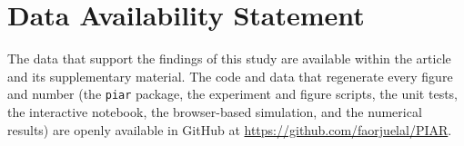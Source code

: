 \documentclass[%
 aip,
 cha,
 amsmath,amssymb,
 reprint,%
 longbibliography,%
]{revtex4-1}
\begin{document}
\section*{Data Availability Statement}
The data that support the findings of this study are available within the article and its supplementary material. The code and data that regenerate every figure and number (the \texttt{piar} package, the experiment and figure scripts, the unit tests, the interactive notebook, the browser-based simulation, and the numerical results) are openly available in GitHub at \url{https://github.com/faorjuelal/PIAR}.

\appendix



\clearpage

\end{document}
